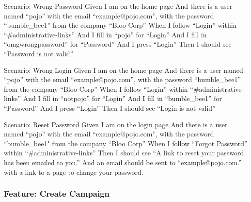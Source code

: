 \documentclass[12pt]{article}
\begin{document}
\begin{hangparas}{0.25in}{1}
Scenario: Wrong Password 
  Given I am on the home page 
  And there is a user named ``pojo'' with the email ``example@pojo.com'', with the password ``bumble\_bee1'' from the company ``Bloo Corp'' 
  When I follow ``Login'' within ``\#administrative-links'' 
  And I fill in ``pojo'' for ``Login'' 
  And I fill in ``omgwrongpassword'' for ``Password'' 
  And I press ``Login'' 
  Then I should see ``Password is not valid'' 

Scenario: Wrong Login 
  Given I am on the home page 
  And there is a user named ``pojo'' with the email ``example@pojo.com'', with the password ``bumble\_bee1'' from the company ``Bloo Corp'' 
  When I follow ``Login'' within ``\#administrative-links'' 
  And I fill in ``notpojo'' for ``Login'' 
  And I fill in ``bumble\_bee1'' for ``Password'' 
  And I press ``Login'' 
  Then I should see ``Login is not valid'' 

Scenario: Reset Password 
  Given I am on the login page 
  And there is a user named ``pojo'' with the email ``example@pojo.com'', with the password ``bumble\_bee1" from the company ``Bloo Corp'' 
  When I follow ``Forgot Password'' within ``\#administrative-links'' 
  Then I should see ``A link to reset your password has been emailed to you.'' 
  And an email should be sent to ``example@pojo.com.'' with a link to a page to change your password. 
\end{hangparas}

\subsubsection{Feature: Create Campaign}
\end{document}
